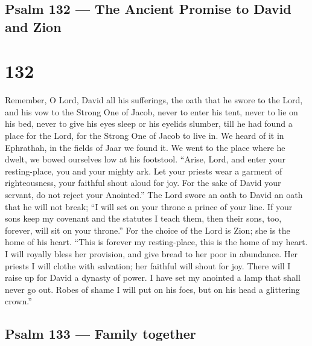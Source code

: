\hypertarget{psalm-132-the-ancient-promise-to-david-and-zion}{%
\subsection{Psalm 132 --- The Ancient Promise to David and
Zion}\label{psalm-132-the-ancient-promise-to-david-and-zion}}

\hypertarget{section-131}{%
\section{132}\label{section-131}}

 Remember, O Lord, David all his sufferings, 
the oath that he swore to the Lord, and his vow to the Strong One of
Jacob,  never to enter his tent, never to lie on his bed,
 never to give his eyes sleep or his eyelids slumber,
 till he had found a place for the Lord, for the Strong One
of Jacob to live in.  We heard of it in Ephrathah, in the
fields of Jaar we found it.  We went to the place where he
dwelt, we bowed ourselves low at his footstool.  ``Arise,
Lord, and enter your resting-place, you and your mighty ark.
 Let your priests wear a garment of righteousness, your
faithful shout aloud for joy.  For the sake of David your
servant, do not reject your Anointed.''  The Lord swore an
oath to David an oath that he will not break; ``I will set on your
throne a prince of your line.  If your sons keep my
covenant and the statutes I teach them, then their sons, too, forever,
will sit on your throne.''  For the choice of the Lord is
Zion; she is the home of his heart.  ``This is forever my
resting-place, this is the home of my heart.  I will
royally bless her provision, and give bread to her poor in abundance.
 Her priests I will clothe with salvation; her faithful
will shout for joy.  There will I raise up for David a
dynasty of power. I have set my anointed a lamp that shall never go out.
 Robes of shame I will put on his foes, but on his head a
glittering crown.''

\hypertarget{psalm-133-family-together}{%
\subsection{Psalm 133 --- Family
together}\label{psalm-133-family-together}}


